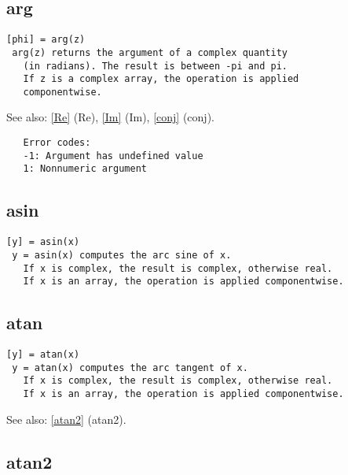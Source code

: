 \documentclass[a4paper]{article}
\begin{document}
\subsection{arg\label{arg}}

\begin{tscreen}
\begin{verbatim}
[phi] = arg(z)
 arg(z) returns the argument of a complex quantity
   (in radians). The result is between -pi and pi.
   If z is a complex array, the operation is applied
   componentwise.
\end{verbatim}

See also: \ref{Re} {(Re)}, \ref{Im} {(Im)}, \ref{conj} {(conj)}.
\begin{verbatim}
   Error codes:
   -1: Argument has undefined value
   1: Nonnumeric argument 
\end{verbatim}
\end{tscreen}



\subsection{asin\label{asin}}

\begin{tscreen}
\begin{verbatim}
[y] = asin(x)
 y = asin(x) computes the arc sine of x.
   If x is complex, the result is complex, otherwise real.
   If x is an array, the operation is applied componentwise.
\end{verbatim}
\end{tscreen}



\subsection{atan\label{atan}}

\begin{tscreen}
\begin{verbatim}
[y] = atan(x)
 y = atan(x) computes the arc tangent of x.
   If x is complex, the result is complex, otherwise real.
   If x is an array, the operation is applied componentwise.
\end{verbatim}

See also: \ref{atan2} {(atan2)}.
\end{tscreen}



\subsection{atan2\label{atan2}}
\end{document}
